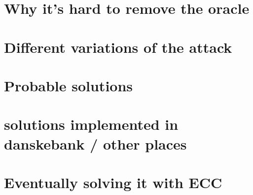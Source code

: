 \documentclass[a4paper,12pt]{report}
\begin{document}
\section{Why it's hard to remove the oracle}
\section{Different variations of the attack}
\section{Probable solutions}
\section{solutions implemented in danskebank / other places}
\section{Eventually solving it with ECC}

{} %

\end{document}
